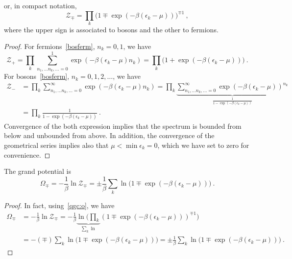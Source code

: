     or, in compact notation, 
    \begin{equation*}
        \mathcal Z_\mp = \prod_k \Big ( 1 \mp \exp(- \beta (\epsilon_k - \mu) ) \Big)^{\mp 1} ~,
    \end{equation*}
    where the upper sign is associated to bosons and the other to fermions.
    \begin{proof}
        For fermions~\eqref{bosferm}, $n_k = 0, 1$, we have
        \begin{equation*}
            \mathcal Z_+ = \prod_k \sum_{n_1, \ldots n_k, \ldots = 0}^1 \exp(-\beta(\epsilon_k - \mu)n_k) = \prod_k \Big (1 + \exp (- \beta (\epsilon_k - \mu)) \Big ) ~.
        \end{equation*}
        For bosons~\eqref{bosferm}, $n_k = 0, 1, 2, \ldots$, we have
        \begin{equation*}
        \begin{aligned}
            \mathcal Z_- & = \prod_k \sum_{n_1, \ldots n_k, \ldots = 0}^\infty \exp(-\beta(\epsilon_k - \mu)n_k) = \prod_k \underbrace{\sum_{n_1, \ldots n_k, \ldots = 0}^\infty \exp(-\beta(\epsilon_k - \mu))^{n_k}}_{ \frac{1}{1 - \exp (- \beta (\epsilon_k - \mu))}} \\ & = \prod_k \frac{1}{1 - \exp (- \beta (\epsilon_k - \mu))} ~.
        \end{aligned}
        \end{equation*}
        Convergence of the both expression implies that the spectrum is bounded from below and unbounded from above. In addition, the convergence of the geometrical series implies also that $\mu < \min \epsilon_k = 0$, which we have set to zero for convenience.
    \end{proof}
    The grand potential is 
    \begin{equation}\label{o1}
        \Omega_\mp = -\frac{1}{\beta} \ln \mathcal Z_\mp = \pm \frac{1}{\beta} \sum_k \ln \Big (1 \mp \exp (-\beta (\epsilon_k - \mu)) \Big) ~.
    \end{equation}
    \begin{proof}
        In fact, using~\eqref{qgc:o}, we have
        \begin{equation*}
        \begin{aligned}
            \Omega_\mp & = -\frac{1}{\beta} \ln \mathcal Z_\mp= - \frac{1}{\beta} \underbrace{\ln \Big (\prod_k}_{\sum_k \ln} ( 1 \mp \exp(- \beta (\epsilon_k - \mu) ))^{\mp 1} \Big ) \\ & = - (\mp) \sum_k \ln \Big (1 \mp \exp (-\beta (\epsilon_k - \mu))) = \pm \frac{1}{\beta} \sum_k \ln \Big (1 \mp \exp (-\beta (\epsilon_k - \mu)) \Big) ~.
        \end{aligned}
        \end{equation*}
    \end{proof}

